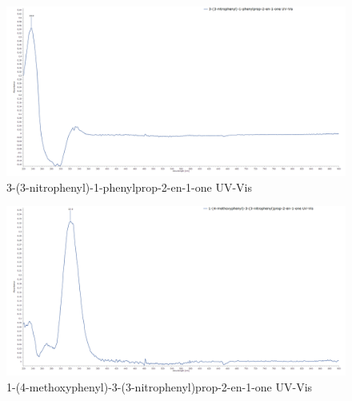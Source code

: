 \documentclass[11pt]{article}
\begin{document}
\newpage
\begin{figure}[H]
    \centering
    \includegraphics[scale=0.234]{spectra/uvvis7.1.png}
    \caption{3-(3-nitrophenyl)-1-phenylprop-2-en-1-one UV-Vis}
\end{figure}
\begin{figure}[H]
    \centering
    \includegraphics[scale=0.234]{spectra/uvvis7.2.png}
    \caption{1-(4-methoxyphenyl)-3-(3-nitrophenyl)prop-2-en-1-one UV-Vis}
\end{figure}

\newpage
\end{document}
